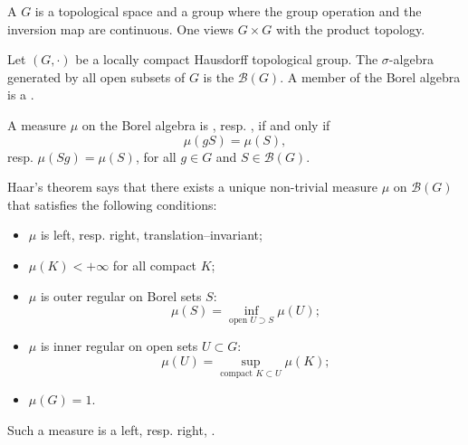 \documentclass [preview, border = 20pt] {standalone}
\begin{document}
\pagecolor{black}
\color{white}
A  $G$ is a topological space and a group where the group operation and the inversion map are continuous. One views $G\times G$ with the product topology.

Let $(G,\cdot)$ be a locally compact Hausdorff topological group. The $\sigma$-algebra generated by all open subsets of $G$ is the  $\mathscr{B}(G)$. A member of the Borel algebra is a .

A measure $\mu$ on the Borel algebra is , resp. , if and only if 
\[
  \mu(gS) = \mu(S),
\] 
resp. $\mu(Sg) = \mu(S)$, for all $g\in G$ and $S\in \mathscr{B}(G)$.

Haar's theorem says that there exists a unique non-trivial measure $\mu$ on $\mathscr{B}(G)$ that satisfies the following conditions:
\begin{itemize}[label = ------,leftmargin = *]
\item $\mu$ is left, resp. right, translation--invariant;
\item $\mu(K) < +\infty$ for all compact $K$;
\item $\mu$ is outer regular on Borel sets $S$:
\[
  \mu(S) = \inf_{\textrm{open $U\supset S$}} \mu(U);
\] 
\item $\mu$ is inner regular on open sets $U\subset G$:
\[
  \mu(U) = \sup_{\textrm{compact $K\subset U$}} \mu(K);
\]
\item $\mu(G) = 1$.
\end{itemize}
Such a measure is a left, resp. right, .
\end{document}
